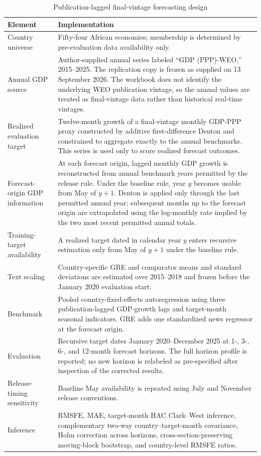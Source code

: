 \begin{table}[htbp]
\centering\scriptsize\singlespacing
\caption{Publication-lagged final-vintage forecasting design}
\label{tab:design}
\renewcommand{\arraystretch}{0.92}
\begin{tabularx}{\textwidth}{p{}X}
\toprule
Element & Implementation \\
\midrule
Country universe & Fifty-four African economies; membership is determined by pre-evaluation data availability only. \\
Annual GDP source & Author-supplied annual series labeled ``GDP (PPP)-WEO,'' 2015--2025. The replication copy is frozen as supplied on 13 September 2026. The workbook does not identify the underlying WEO publication vintage, so the annual values are treated as final-vintage data rather than historical real-time vintages. \\
Realized evaluation target & Twelve-month growth of a final-vintage monthly GDP-PPP proxy constructed by additive first-difference Denton and constrained to aggregate exactly to the annual benchmarks. This series is used only to score realized forecast outcomes. \\
Forecast-origin GDP information & At each forecast origin, lagged monthly GDP growth is reconstructed from annual benchmark years permitted by the release rule. Under the baseline rule, year $y$ becomes usable from May of $y+1$. Denton is applied only through the last permitted annual year; subsequent months up to the forecast origin are extrapolated using the log-monthly rate implied by the two most recent permitted annual totals. \\
Training-target availability & A realized target dated in calendar year $y$ enters recursive estimation only from May of $y+1$ under the baseline rule. \\
Text scaling & Country-specific GRE and comparator means and standard deviations are estimated over 2015--2018 and frozen before the January 2020 evaluation start. \\
Benchmark & Pooled country-fixed-effects autoregression using three publication-lagged GDP-growth lags and target-month seasonal indicators. GRE adds one standardized news regressor at the forecast origin. \\
Evaluation & Recursive target dates January 2020--December 2025 at 1-, 3-, 6-, and 12-month forecast horizons. The full horizon profile is reported; no new horizon is relabeled as pre-specified after inspection of the corrected results. \\
Release-timing sensitivity & Baseline May availability is repeated using July and November release conventions. \\
Inference & RMSFE, MAE, target-month HAC Clark--West inference, complementary two-way country--target-month covariance, Holm correction across horizons, cross-section-preserving moving-block bootstrap, and country-level RMSFE ratios. \\
\bottomrule
\end{tabularx}
\end{table}

